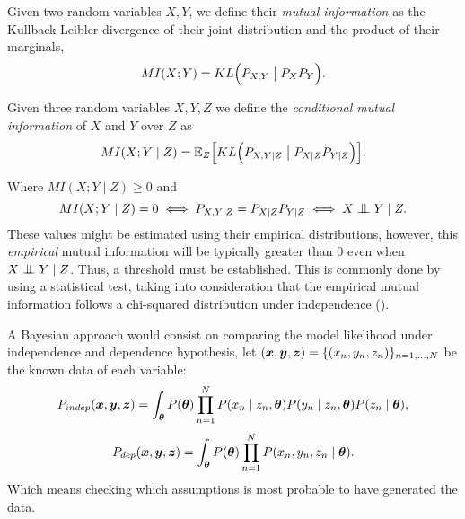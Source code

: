 \begin{definition}
  Given two random variables \(X, Y\), we define their \emph{mutual information} as the Kullback-Leibler divergence of their joint distribution and the product of their marginals,
  \[
    MI(X;Y) = KL\Big(P_{X,Y} \bigm| P_{X}P_{Y}\Big).
  \]
\end{definition}

\begin{definition}
  Given three random variables \(X, Y, Z\) we define the \emph{conditional mutual information} of \(X\) and \(Y\) over \(Z\) as
  \[
    MI(X;Y\mid Z) = \mathbb{E}_{Z}\Big[KL\Big(P_{X,Y \mid Z} \bigm| P_{X\mid Z} P_{Y \mid Z}\Big)\Big].
  \]
\end{definition}
Where \(MI(X;Y \mid Z) \geq 0\) and
\[
MI(X;Y \mid Z) = 0 \iff P_{X,Y \mid Z} = P_{X\mid Z} P_{Y \mid Z} \iff X\bigCI Y \mid Z.
\]
These values might be estimated using their empirical distributions, however, this \emph{empirical} mutual information will be typically greater than \(0\) even when \(X\bigCI Y \mid Z\). Thus, a threshold must be established. This is commonly done by using a statistical test, taking into consideration that the empirical mutual information follows a chi-squared distribution under independence (\cite{kullback1997information}).

A Bayesian approach would consist on comparing the model likelihood under independence and dependence hypothesis, let \((\bm{x}, \bm{y}, \bm{z}) = \{(x_{n}, y_{n}, z_{n})\}_{n=1,\dots, N}\) be the known data of each variable:
\[
  P_{indep}(\bm{x},\bm{y},\bm{z}) = \int_{\bm{\theta}} P(\bm{\theta}) \prod_{n=1}^{N} P(x_{n}\mid z_{n}, \bm{\theta})P(y_{n} \mid z_{n}, \bm{\theta})P(z_{n} \mid \bm{\theta}),
\]
\[
P_{dep}(\bm{x}, \bm{y}, \bm{z}) = \int_{\bm{\theta}} P(\bm{\theta}) \prod_{n=1}^{N}P(x_{n}, y_{n}, z_{n} \mid \bm{\theta}).
\]
Which means checking which assumptions is most probable to have generated the data.

